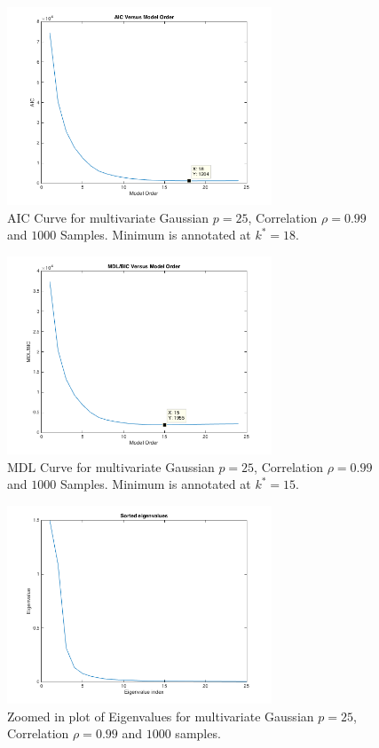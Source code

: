 \documentclass[journal]{IEEEtran}
\begin{document}
\begin{figure}[h]
\centering
\includegraphics[width=3.1in]{../images/model_fit_example_aic_25_099_1000.png}
\caption{AIC Curve for multivariate Gaussian \(p=25\), Correlation \(\rho = 0.99\) and \(1000\) Samples. Minimum is annotated at \(k^* = 18\).}
\label{fig:fit_aic}
\end{figure}

\begin{figure}[h]
\centering
\includegraphics[width=3.1in]{../images/model_fit_example_mdl_25_099_1000.png}
\caption{MDL Curve for multivariate Gaussian \(p=25\), Correlation \(\rho = 0.99\) and \(1000\) Samples. Minimum is annotated at \(k^* = 15\).}
\label{fig:fit_mdl}
\end{figure}

\begin{figure}[h!]
\centering
\includegraphics[width=3.1in]{../images/eigs.png}
\caption{Zoomed in plot of Eigenvalues for multivariate Gaussian \(p = 25\), Correlation \(\rho = 0.99\) and \(1000\) samples.}
\label{fig:eigs}
\end{figure}
\end{document}
